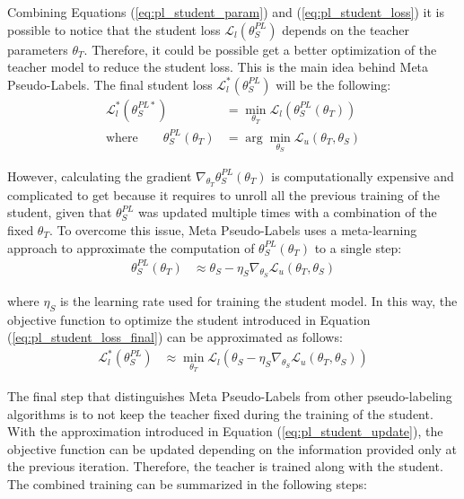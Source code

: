 Combining Equations (\ref{eq:pl_student_param}) and (\ref{eq:pl_student_loss}) 
it is possible to notice that the student loss $\mathcal{L}_l(\theta_S^{PL})$ 
depends on the teacher parameters $\theta_T$. Therefore, it could be possible 
get a better optimization of the teacher model to reduce the student loss. 
This is the main idea behind Meta Pseudo-Labels.
The final student loss $\mathcal{L}_l^*(\theta_S^{PL})$ will be the following:
\begin{align}
    \mathcal{L}^*_l(\theta_S^{PL*}) &= \min_{\theta_T} \mathcal{L}_l(\theta_S^{PL}(\theta_T))
    \label{eq:pl_student_loss_final} \\
    \text{where} \qquad \theta_S^{PL}(\theta_T) &= \arg\min_{\theta_S} \mathcal{L}_u(\theta_T, \theta_S)
    \nonumber
\end{align}

However, calculating the gradient $\nabla_{\theta_T}\theta^{PL}_S(\theta_T)$ 
is computationally expensive and complicated to get because it requires to 
unroll all the previous training of the student, given that $\theta_S^{PL}$ was updated 
multiple times with a combination of the fixed $\theta_T$.
To overcome this issue, Meta Pseudo-Labels uses a meta-learning approach to 
approximate  
the computation of $\theta_S^{PL}(\theta_T)$ to a single step:
\begin{align}
    \theta_S^{PL}(\theta_T) &\approx \theta_S - \eta_S \nabla_{\theta_S} \mathcal{L}_u(\theta_T, \theta_S)
    \label{eq:pl_student_update}
\end{align}

where $\eta_S$ is the learning rate used for training the student model.
In this way, the objective function to optimize the student introduced in 
Equation (\ref{eq:pl_student_loss_final}) can be approximated as follows:
\begin{align}
    \mathcal{L}^*_l(\theta_S^{PL}) &\approx \min_{\theta_T} \mathcal{L}_l(\theta_S - \eta_S \nabla_{\theta_S} \mathcal{L}_u(\theta_T, \theta_S))
    \label{eq:pl_student_loss_final_approx}
\end{align}

The final step that distinguishes Meta Pseudo-Labels from other pseudo-labeling 
algorithms is to not keep the teacher fixed during the training of the student. 
With the approximation introduced in Equation (\ref{eq:pl_student_update}), 
the objective function can be updated depending on the information provided only 
at the previous iteration.
Therefore, the teacher is trained along with the student.
The combined training can be summarized in the following steps:

